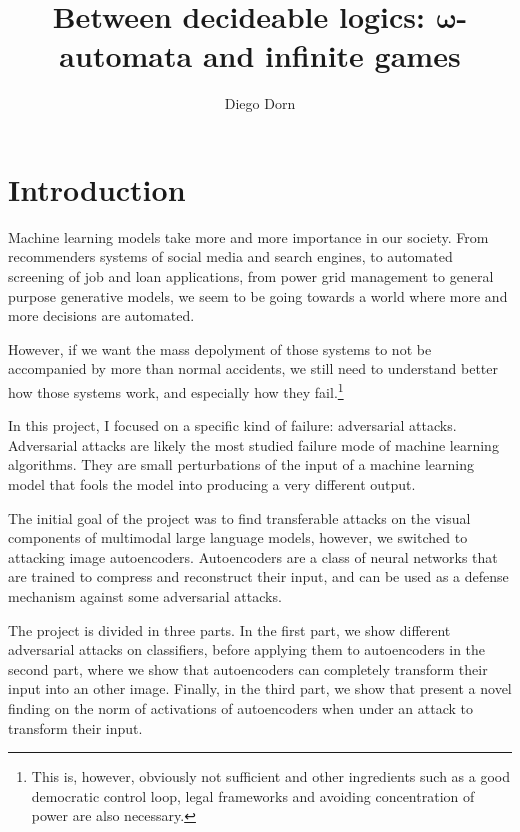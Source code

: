 \documentclass[]{scrarticle}
\title{Between decideable logics: $\mathbf{\omega}$-automata and infinite games}
\author{Diego Dorn}
\renewcommand{\todo}[1]{}
\begin{document}




\section*{Introduction}

Machine learning models take more and more importance in our society.
From recommenders systems of social media and search engines,
to automated screening of job and loan applications,
from power grid management
to general purpose generative models,
we seem to be going towards a world where more and more decisions
are automated.

However, if we want the mass depolyment of those systems
to not be accompanied by more than normal accidents,
we still need to understand better how those systems work,
and especially how they fail.\footnote{
  This is, however, obviously not sufficient
  and other ingredients such as a good democratic control loop,
  legal frameworks and avoiding concentration of power
  are also necessary.}

In this project, I focused on a specific kind of failure:
adversarial attacks. Adversarial attacks are likely the most
studied failure mode of machine learning algorithms.
They are small perturbations
of the input of a machine learning model that
fools the model into producing a very different output.

The initial goal of the project was to find transferable attacks
on the visual components of multimodal large language models,
however, we switched to attacking image autoencoders.
Autoencoders are a class of neural networks that are trained
to compress and reconstruct their input, and can be used
as a defense mechanism against some adversarial attacks.

The project is divided in three parts. In the first part,
we show different adversarial attacks on classifiers,
before applying them to autoencoders in the second part,
where we show that autoencoders can completely
transform their input into an other image.
Finally, in the third part, we show that present
a novel finding on the norm of activations of
autoencoders when under an attack to transform their input.



\end{document}
